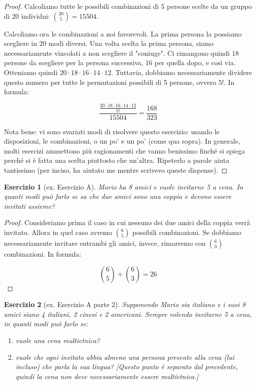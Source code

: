 \documentclass[12pt]{article}
\newtheorem{theorem}{Esercizio}
\begin{document}
\begin{proof}
	Calcoliamo tutte le possibili combinazioni di 5 persone scelte da un gruppo di 20 individui: $\binom{20}{5} = 15504$.
	
	Calcoliamo ora le combinazioni a noi favorevoli. La prima persona la possiamo scegliere in 20 modi diversi. Una volta scelta la prima persona, siamo necessariamente vincolati a non scegliere il "coniuge". Ci rimangono quindi 18 persone da scegliere per la persona successiva, 16 per quella dopo, e così via. Otteniamo quindi $20 \cdot 18 \cdot 16 \cdot 14 \cdot 12$. Tuttavia, dobbiamo necessariamente dividere questo numero per tutte le permutazioni possibili di 5 persone, ovvero 5!. In formula:
	
	\[
		\frac{\frac{20 \cdot 18 \cdot 16 \cdot 14 \cdot 12}{5!}}{ 15504} = \frac{168}{323}
	\]
	
	Nota bene: vi sono svariati modi di risolvere questo esercizio: usando le disposizioni, le combinazioni, o un po' e un po' (come qua sopra). In generale, molti esercizi ammettono più ragionamenti che vanno benissimo finché si spiega perché si è fatta una scelta piuttosto che un'altra. Ripeterlo a parole aiuta tantissimo (per inciso, ha aiutato me mentre scrivevo queste dispense).
\end{proof}

\begin{theorem}[ex. Esercizio A]
	Mario ha 8 amici e vuole invitarne 5 a cena. In quanti modi può farlo se sa che due amici sono una coppia e devono essere invitati assieme?
\end{theorem}

\begin{proof}
	Consideriamo prima il caso in cui nessuno dei due amici della coppia verrà invitato. Allora in quel caso avremo $\binom{6}{5}$ possibili combinazioni. Se dobbiamo necessariamente invitare entrambi gli amici, invece, rimarremo con $\binom{6}{3}$ combinazioni. In formula:
	
	\[
		\binom{6}{5} + \binom{6}{3} = 26
	\]
	
\end{proof}

\begin{theorem}[ex. Esercizio A parte 2]
	Supponendo Mario sia italiano e i suoi 8 amici siano 4 italiani, 2 cinesi e 2 americani. Sempre volendo invitarne 5 a cena, in quanti modi può farlo se:
	\begin{enumerate}
		\item vuole una cena multietnica?
		\item vuole che ogni invitato abbia almeno una persona presente alla cena (lui incluso) che parla la sua lingua? [Questo punto è separato dal precedente, quindi la cena non deve necessariamente essere multietnica.]
	\end{enumerate}
\end{theorem}
\end{document}
